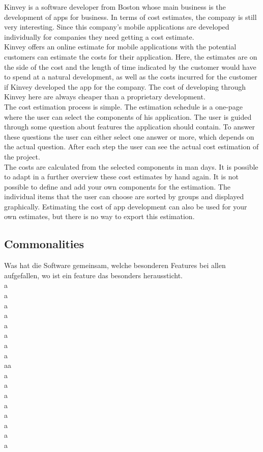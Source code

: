 Kinvey is a software developer from Boston whose main business is the development of apps for business. In terms of cost estimates, the company is still very interesting. Since this company's mobile applications are developed individually for companies they need getting a cost estimate.
\\
Kinvey offers an online estimate for mobile applications with the potential customers can estimate the costs for their application. Here, the estimates are on the side of the cost and the length of time indicated by the customer would have to spend at a natural development, as well as the costs incurred for the customer if Kinvey developed the app for the company. The cost of developing through Kinvey here are always cheaper than a proprietary development.
\\
The cost estimation process is simple. The estimation schedule is a one-page where the user can select the components of his application. The user is guided through some question about features the application should contain. To answer these questions the user can either select one answer or more, which depends on the actual question. After each step the user can see the actual cost estimation of the project.
\\
The costs are calculated from the selected components in man days. It is possible to adapt in a further overview these cost estimates by hand again. It is not possible to define and add your own components for the estimation. The individual items that the user can choose are sorted by groups and displayed graphically. Estimating the cost of app development can also be used for your own estimates, but there is no way to export this estimation.

\subsection{Commonalities}

Was hat die Software gemeinsam, welche besonderen Features bei allen aufgefallen, wo ist ein feature das besonders heraussticht.\\
a\\
a\\
a\\
a\\
a\\
a\\
a\\
a\\
aa\\
a\\
a\\
a\\
a\\
a\\
a\\
a\\
a